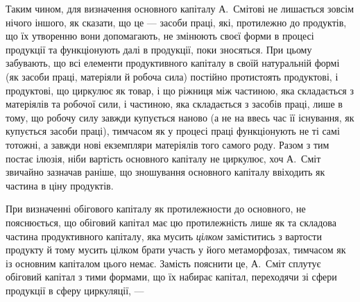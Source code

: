 Таким чином, для визначення основного капіталу А.~Смітові не лишається
зовсім нічого іншого, як сказати, що це — засоби праці, які, протилежно
до продуктів, що їх утворенню вони допомагають, не змінюють
своєї форми в процесі продукції та функціонують далі в продукції, поки
зносяться. При цьому забувають, що всі елементи продуктивного капіталу
в своїй натуральній формі (як засоби праці, матеріяли й робоча сила)
постійно протистоять продуктові, і продуктові, що циркулює як товар,
і що ріжниця між частиною, яка складається з матеріялів та робочої
сили, і частиною, яка складається з засобів праці, лише в тому, що
робочу силу завжди купується наново (а не на ввесь час її існування,
як купується засоби праці), тимчасом як у процесі праці функціонують
не ті самі тотожні, а завжди нові екземпляри матеріялів того самого роду.
Разом з тим постає ілюзія, ніби вартість основного капіталу не циркулює,
хоч А.~Сміт звичайно зазначав раніше, що зношування основного
капіталу ввіходить як частина в ціну продуктів.

При визначенні обігового капіталу як протилежности до основного,
не пояснюється, що обіговий капітал має цю протилежність лише як та
складова частина продуктивного капіталу, яка мусить \emph{цілком} заміститись
з вартости продукту й тому мусить цілком брати участь у його
метаморфозах, тимчасом як із основним капіталом цього немає. Замість
пояснити це, А.~Сміт сплутує обіговий капітал з тими формами, що їх
набирає капітал, переходячи зі сфери продукції в сферу циркуляції, —
\parbreak{}  %
